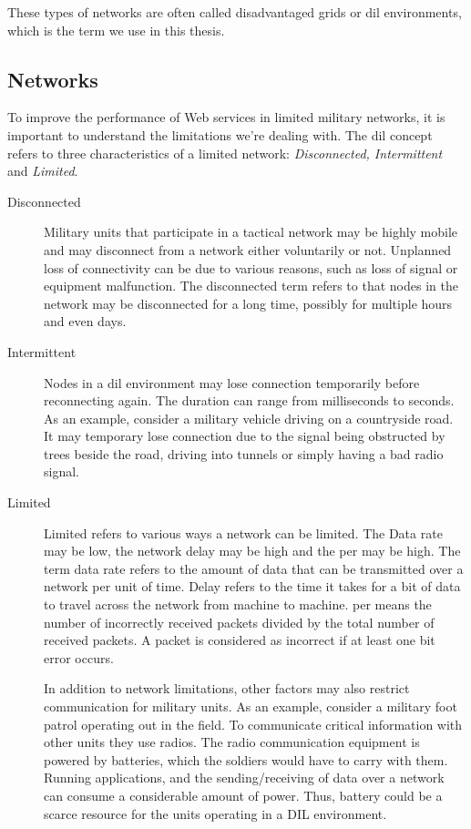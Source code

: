These types of networks are often called disadvantaged grids or \gls{dil}
environments, which is the term we use in this thesis.

\subsection{ Networks}
\label{dil}

To improve the performance of Web services in limited military networks, it is
important to understand the limitations we're dealing with. The \gls{dil}
concept refers to three characteristics of a limited network:
\textit{Disconnected, Intermittent} and \textit{Limited}.

\begin{description}
\item[Disconnected]

Military units that participate in a tactical network may be highly mobile and
may disconnect from a network either voluntarily or not. Unplanned loss of
connectivity can be due to various reasons, such as loss of signal or equipment
malfunction.  The disconnected term refers to that nodes in the network may be
disconnected for a long time, possibly for multiple hours and even days.

\item[Intermittent]

Nodes in a \gls{dil} environment may lose connection temporarily before
reconnecting again. The duration can range from milliseconds to seconds. As an
example, consider a military vehicle driving on a countryside road. It may
temporary lose connection due to the signal being obstructed by trees beside
the road, driving into tunnels or simply having a bad radio signal.

\item[Limited] Limited refers to various ways a network can be limited. The Data
rate may be low, the network delay may be high and the \gls{per} may be high.
The term data rate refers to the amount of data that can be transmitted over a
network per unit of time. Delay refers to the time it takes for a bit of data to
travel across the network from machine to machine. \gls{per} means the number of
incorrectly received packets divided by the total number of received packets. A
packet is considered as incorrect if at least one bit error occurs.

In addition to network limitations, other factors may also restrict
communication for military units. As an example, consider a military foot patrol
operating out in the field. To communicate critical information with other units
they use radios. The radio communication equipment is powered by batteries,
which the soldiers would have to carry with them. Running applications, and the
sending/receiving of data over a network can consume a considerable amount of
power. Thus, battery could be a scarce resource for the units operating in a DIL
environment.

\end{description}

